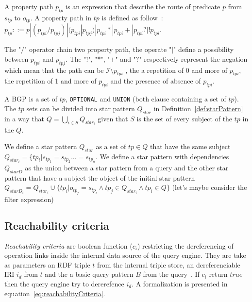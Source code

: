 \begin{definition}\label{def:propertyPath}
   A property path $p_{tp}$ is an expression that describe the route of predicate $p$ from $s_{tp}$ to $o_{tp}$.
   A property path in $tp$ is defined as follow~:
   $p_{tp} ::= p | (p_{tpi}/p_{tpj}) | (p_{tpi}|p_{tpj}) | p_{tpi}* | p_{tpi}+ | p_{tpi}? | !p_{tpi}$.

   The "$/$" operator chain two property path, the operate "$|$" define a possibility between $p_{tpi}$ and $p_{tpj}$.
   The "$!$", "$*$", "$+$" and "$?$" respectively represent the negation which mean that the path can be $\mathcal{I} \setminus p_{tpi}$
   , the a repetition of 0 and more of $p_{tpi}$, 
   the repetition of 1 and more of $p_{tpi}$ and the presence of absence of $p_{tpi}$.
\end{definition}

\begin{definition}[BGP]\label{def:bgp}
 A BGP is a set of $tp$, \texttt{OPTIONAL} and \texttt{UNION} (both clause containing a set of $tp$).
 The $tp$ sets can be divided into star pattern $Q_{star}$ in Definition~\ref{def:starPattern} in a way 
 that $Q = \bigcup_{i\in S} Q_{star_i}$ given that $S$ is the set of every subject of the $tp$ in the $Q$.
\end{definition}


\begin{definition}\label{def:starPattern}
We define a star pattern $Q_{star}$ as a set of $tp \in Q$ that have the same subject $Q_{star_i} = \{ tp_i| s_{tp_1} = s_{tp_2} ... = s_{tp_n}$.
We define a star pattern with dependencies $Q_{starD}$ as the union between a star pattern from a query and the other star pattern that have a subject
the object of the initial star pattern $Q_{starD_i} = Q_{star_i} \cup \{tp_i| o_{tp_j} = s_{tp_i} \land tp_j \in Q_{star_i} \land tp_i \in Q \}$
(let's maybe consider the filter expression)
\end{definition}

\subsection{Reachability criteria}

\emph{Reachability criteria} are boolean function ($c_i$) restricting the dereferencing of operation links inside the internal data source of the query engine.
They are take as parameters an RDF triple $t$ from the internal triple store, an dereferenciable IRI $i_d$ from $t$ and the a basic query pattern $B$ from the query~\cite{Hartig2012}.
If $c_i$ return $true$ then the query engine try to dererefence $i_d$.
A formalization is presented in equation~\ref{eq:reachabilityCriteria}.



